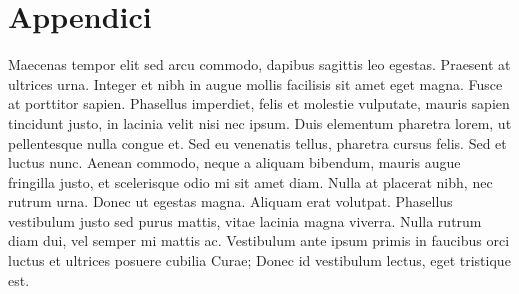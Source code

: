\documentclass[target=mst,babel=\babelopt]{thud}[2014/01/17]
\begin{document}
\appendix

\part{Appendici}



\backmatter

\summary Maecenas tempor elit sed arcu commodo, dapibus sagittis leo
egestas. Praesent at ultrices urna. Integer et nibh in augue mollis
facilisis sit amet eget magna. Fusce at porttitor sapien. Phasellus
imperdiet, felis et molestie vulputate, mauris sapien tincidunt justo,
in lacinia velit nisi nec ipsum. Duis elementum pharetra lorem, ut
pellentesque nulla congue et. Sed eu venenatis tellus, pharetra cursus
felis. Sed et luctus nunc. Aenean commodo, neque a aliquam bibendum,
mauris augue fringilla justo, et scelerisque odio mi sit amet
diam. Nulla at placerat nibh, nec rutrum urna. Donec ut egestas
magna. Aliquam erat volutpat. Phasellus vestibulum justo sed purus
mattis, vitae lacinia magna viverra. Nulla rutrum diam dui, vel semper
mi mattis ac. Vestibulum ante ipsum primis in faucibus orci luctus et
ultrices posuere cubilia Curae; Donec id vestibulum lectus, eget
tristique est.



\end{document}
